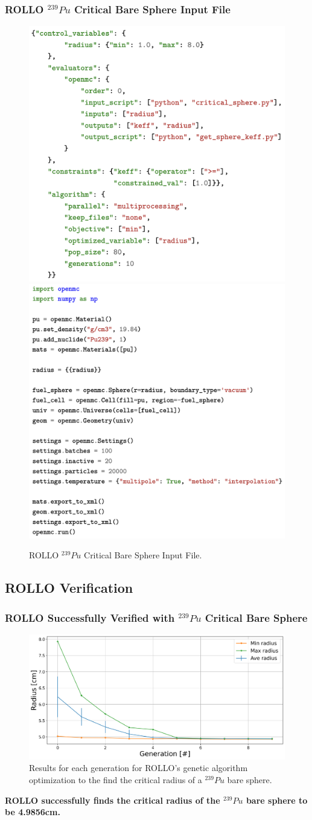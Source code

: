 \begin{frame}
    \frametitle{ROLLO $^{239}Pu$ Critical Bare Sphere Input File}
    \begin{figure}
        \includegraphics[width=0.49\linewidth]{figures/rollo-verify-file.png} 
        \includegraphics[width=0.49\linewidth]{figures/rollo-verify-file2.png}
        \caption{ROLLO $^{239}Pu$ Critical Bare Sphere Input File.}
    \end{figure}
\end{frame}

\subsection{ROLLO Verification}
\begin{frame}
    \frametitle{ROLLO Successfully Verified with $^{239}Pu$ Critical Bare Sphere}
    \begin{figure}
        \includegraphics[width=0.85\linewidth]{../docs/figures/radius-convergence.png} 
        \caption{Results for each generation for \gls{ROLLO}'s genetic algorithm 
        optimization to the find the critical radius of a  $^{239}Pu$ bare sphere.}
    \end{figure}
    \textbf{ROLLO successfully finds the critical radius of the $^{239}Pu$ bare sphere 
    to be 4.9856cm.}
\end{frame}

